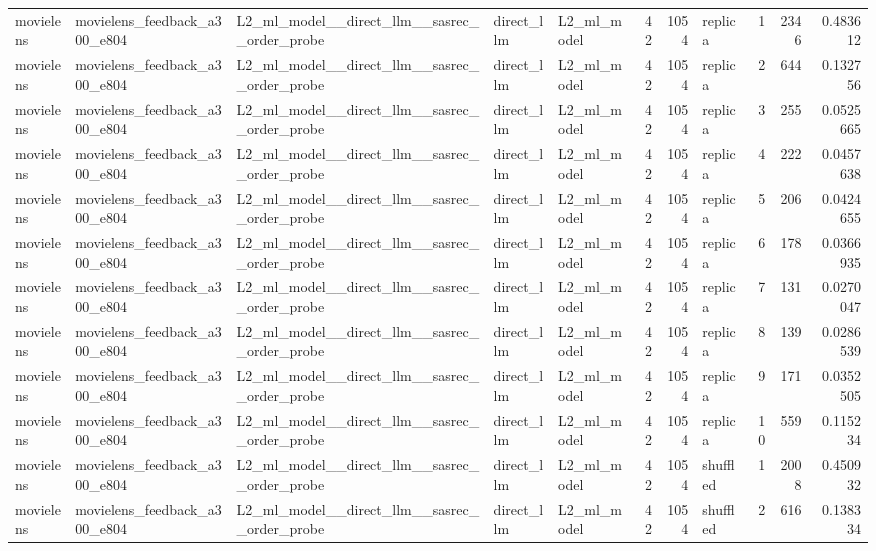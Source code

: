 \begin{table}[htbp!]
\begin{tabular}{lllllrrlrrr}
movielens & movielens\_feedback\_a300\_e804 & L2\_ml\_model\_\_direct\_llm\_\_sasrec\_\_order\_probe & direct\_llm & L2\_ml\_model & 42 & 1054 & replica & 1 & 2346 & 0.483612 \\
movielens & movielens\_feedback\_a300\_e804 & L2\_ml\_model\_\_direct\_llm\_\_sasrec\_\_order\_probe & direct\_llm & L2\_ml\_model & 42 & 1054 & replica & 2 & 644 & 0.132756 \\
movielens & movielens\_feedback\_a300\_e804 & L2\_ml\_model\_\_direct\_llm\_\_sasrec\_\_order\_probe & direct\_llm & L2\_ml\_model & 42 & 1054 & replica & 3 & 255 & 0.0525665 \\
movielens & movielens\_feedback\_a300\_e804 & L2\_ml\_model\_\_direct\_llm\_\_sasrec\_\_order\_probe & direct\_llm & L2\_ml\_model & 42 & 1054 & replica & 4 & 222 & 0.0457638 \\
movielens & movielens\_feedback\_a300\_e804 & L2\_ml\_model\_\_direct\_llm\_\_sasrec\_\_order\_probe & direct\_llm & L2\_ml\_model & 42 & 1054 & replica & 5 & 206 & 0.0424655 \\
movielens & movielens\_feedback\_a300\_e804 & L2\_ml\_model\_\_direct\_llm\_\_sasrec\_\_order\_probe & direct\_llm & L2\_ml\_model & 42 & 1054 & replica & 6 & 178 & 0.0366935 \\
movielens & movielens\_feedback\_a300\_e804 & L2\_ml\_model\_\_direct\_llm\_\_sasrec\_\_order\_probe & direct\_llm & L2\_ml\_model & 42 & 1054 & replica & 7 & 131 & 0.0270047 \\
movielens & movielens\_feedback\_a300\_e804 & L2\_ml\_model\_\_direct\_llm\_\_sasrec\_\_order\_probe & direct\_llm & L2\_ml\_model & 42 & 1054 & replica & 8 & 139 & 0.0286539 \\
movielens & movielens\_feedback\_a300\_e804 & L2\_ml\_model\_\_direct\_llm\_\_sasrec\_\_order\_probe & direct\_llm & L2\_ml\_model & 42 & 1054 & replica & 9 & 171 & 0.0352505 \\
movielens & movielens\_feedback\_a300\_e804 & L2\_ml\_model\_\_direct\_llm\_\_sasrec\_\_order\_probe & direct\_llm & L2\_ml\_model & 42 & 1054 & replica & 10 & 559 & 0.115234 \\
movielens & movielens\_feedback\_a300\_e804 & L2\_ml\_model\_\_direct\_llm\_\_sasrec\_\_order\_probe & direct\_llm & L2\_ml\_model & 42 & 1054 & shuffled & 1 & 2008 & 0.450932 \\
movielens & movielens\_feedback\_a300\_e804 & L2\_ml\_model\_\_direct\_llm\_\_sasrec\_\_order\_probe & direct\_llm & L2\_ml\_model & 42 & 1054 & shuffled & 2 & 616 & 0.138334 \\

\end{tabular}
\end{table}
